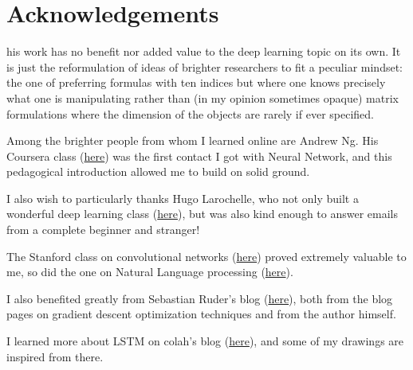\chapter{Acknowledgements}

his work has no benefit nor added value to the deep learning topic on its own. It is just the reformulation of ideas of brighter researchers to fit a peculiar mindset: the one of preferring formulas with ten indices but where one knows precisely what one is manipulating rather than (in my opinion sometimes opaque) matrix formulations where the dimension of the objects are rarely if ever specified.

\vspace{0.2cm}

Among the brighter people from whom I learned online are Andrew Ng. His Coursera class (\href{https://www.coursera.org/learn/machine-learning}{here}) was the first contact I got with Neural Network, and this pedagogical introduction allowed me to build on solid ground.

\vspace{0.2cm}

I also wish to particularly thanks Hugo Larochelle, who not only built a wonderful deep learning class (\href{http://info.usherbrooke.ca/hlarochelle/neural_networks/content.html}{here}), but was also kind enough to answer emails from a complete beginner and stranger!

\vspace{0.2cm}

The Stanford class on convolutional networks (\href{http://cs231n.github.io/convolutional-networks/}{here}) proved extremely valuable to me, so did the one on Natural Language processing (\href{http://web.stanford.edu/class/cs224n/}{here}).

\vspace{0.2cm}

I also benefited greatly from Sebastian Ruder's blog (\href{http://ruder.io/#open}{here}), both from the blog pages on gradient descent optimization techniques and from the author himself.

\vspace{0.2cm}

I learned more about LSTM on colah's blog (\href{http://colah.github.io/posts/2015-08-Understanding-LSTMs/}{here}), and some of my drawings are inspired from there.

\vspace{0.2cm}

